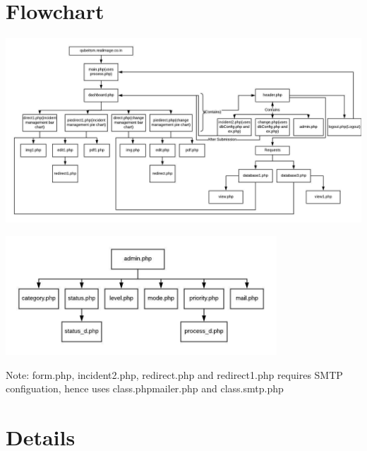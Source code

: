 \documentclass{article}
\begin{document}
\section{Flowchart}
\begin{center}

    \includegraphics[width=7.0in]{itsm.jpeg}
   
    \label{Flowchart}

\end{center}
\begin{center}

    \includegraphics[width=4.0in]{admin.jpeg}
   
    \label{Flowchart}

\end{center}
Note: form.php, incident2.php, redirect.php and redirect1.php requires SMTP configuation, hence uses class.phpmailer.php and class.smtp.php
\section{Details}
\end{document}
